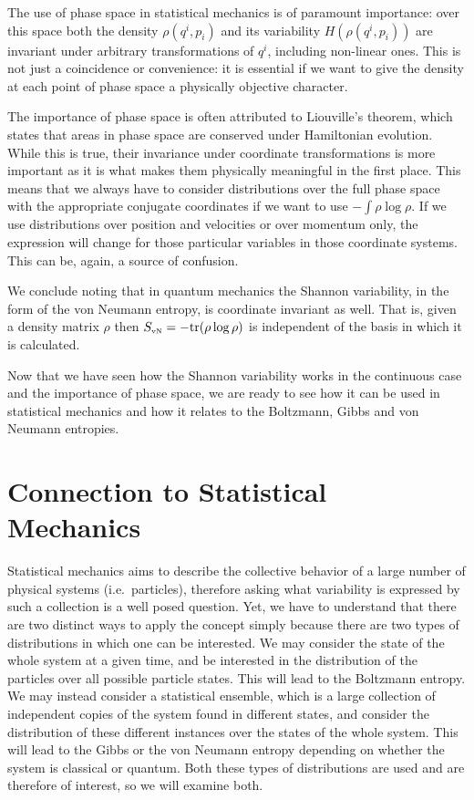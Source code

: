 \documentclass[iopart]{revtex4-1}
\begin{document}
The use of phase space in statistical mechanics is of paramount importance: over this space both the density $\rho(q^i, p
_i)$ and its variability $H(\rho(q^i, p
_i))$ are invariant under arbitrary transformations of $q^i$, including non-linear ones. This is not just a coincidence or convenience: it is essential if we want to give the density at each point of phase space a physically objective character.

The importance of phase space is often attributed to Liouville's theorem, which states that areas in phase space are conserved under Hamiltonian evolution. While this is true, their invariance under coordinate transformations is more important as it is what makes them physically meaningful in the first place. This means that we always have to consider distributions over the full phase space with the appropriate conjugate coordinates if we want to use $-\int \rho \log \rho$. If we use distributions over position and velocities or over momentum only, the expression will change for those particular variables in those coordinate systems. This can be, again, a source of confusion.\cite{Dunkel}


We conclude noting that in quantum mechanics the Shannon variability, in the form of the von Neumann entropy, is coordinate invariant as well. That is, given a density matrix $\rho$ then $S_\textrm{\tiny{vN}} = - \textrm{tr}(\rho \log \rho)$ is independent of the basis in which it is calculated.

Now that we have seen how the Shannon variability works in the continuous case and the importance of phase space, we are ready to see how it can be used in statistical mechanics and how it relates to the Boltzmann, Gibbs and von Neumann entropies.

\section{Connection to Statistical Mechanics\label{csm}}

Statistical mechanics aims to describe the collective behavior of a large number of physical systems (i.e.~particles), therefore asking what variability is expressed by such a collection is a well posed question. Yet, we have to understand that there are two distinct ways to apply the concept simply because there are two types of distributions in which one can be interested. We may consider the state of the whole system at a given time, and be interested in the distribution of the particles over all possible particle states. This will lead to the Boltzmann entropy. We may instead consider a statistical ensemble, which is a large collection of independent copies of the system found in different states, and consider the distribution of these different instances over the states of the whole system. This will lead to the Gibbs or the von Neumann entropy depending on whether the system is classical or quantum. Both these types of distributions are used and are therefore of interest, so we will examine both.
\end{document}
